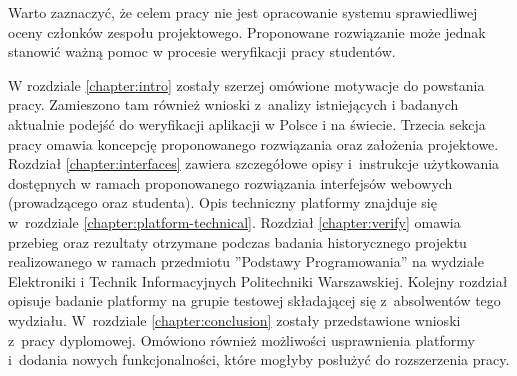 Warto zaznaczyć, że celem pracy nie jest opracowanie systemu sprawiedliwej oceny członków zespołu projektowego.
Proponowane rozwiązanie może jednak stanowić ważną pomoc w procesie weryfikacji pracy studentów.

W rozdziale \ref{chapter:intro} zostały szerzej omówione motywacje do powstania pracy.
Zamieszono tam również wnioski z~analizy istniejących i badanych aktualnie podejść do weryfikacji aplikacji w Polsce i na świecie.
Trzecia sekcja pracy omawia koncepcję proponowanego rozwiązania oraz założenia projektowe.
Rozdział \ref{chapter:interfaces} zawiera szczegółowe opisy i~instrukcje użytkowania dostępnych w ramach proponowanego rozwiązania interfejsów webowych (prowadzącego oraz studenta).
Opis techniczny platformy znajduje się w~rozdziale \ref{chapter:platform-technical}.
Rozdział \ref{chapter:verify} omawia przebieg oraz rezultaty otrzymane podczas badania historycznego projektu realizowanego w ramach przedmiotu ”Podstawy Programowania” na wydziale Elektroniki i Technik Informacyjnych Politechniki Warszawskiej.
Kolejny rozdział opisuje badanie platformy na grupie testowej składającej się z~absolwentów tego wydziału.
W~rozdziale \ref{chapter:conclusion} zostały przedstawione wnioski z~pracy dyplomowej.
Omówiono również możliwości usprawnienia platformy i~dodania nowych funkcjonalności, które mogłyby posłużyć do rozszerzenia pracy.





